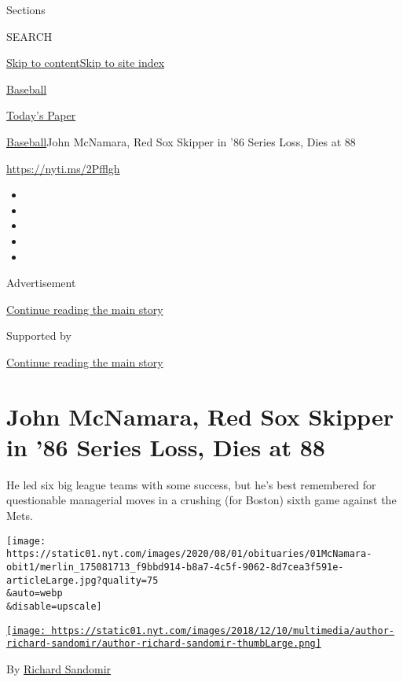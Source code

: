 Sections

SEARCH

\protect\hyperlink{site-content}{Skip to
content}\protect\hyperlink{site-index}{Skip to site index}

\href{https://www.nytimes.com/section/sports/baseball}{Baseball}

\href{https://myaccount.nytimes.com/auth/login?response_type=cookie\&client_id=vi}{}

\href{https://www.nytimes.com/section/todayspaper}{Today's Paper}

\href{/section/sports/baseball}{Baseball}\textbar{}John McNamara, Red
Sox Skipper in '86 Series Loss, Dies at 88

\url{https://nyti.ms/2Pfflgh}

\begin{itemize}
\item
\item
\item
\item
\item
\end{itemize}

Advertisement

\protect\hyperlink{after-top}{Continue reading the main story}

Supported by

\protect\hyperlink{after-sponsor}{Continue reading the main story}

\hypertarget{john-mcnamara-red-sox-skipper-in-86-series-loss-dies-at-88}{%
\section{John McNamara, Red Sox Skipper in '86 Series Loss, Dies at
88}\label{john-mcnamara-red-sox-skipper-in-86-series-loss-dies-at-88}}

He led six big league teams with some success, but he's best remembered
for questionable managerial moves in a crushing (for Boston) sixth game
against the Mets.

\texttt{[image: https://static01.nyt.com/images/2020/08/01/obituaries/01McNamara-obit1/merlin\_175081713\_f9bbd914-b8a7-4c5f-9062-8d7cea3f591e-articleLarge.jpg?quality=75\\\&auto=webp\\\&disable=upscale]}

\href{https://www.nytimes.com/by/richard-sandomir}{\texttt{[image: https://static01.nyt.com/images/2018/12/10/multimedia/author-richard-sandomir/author-richard-sandomir-thumbLarge.png]}}

By \href{https://www.nytimes.com/by/richard-sandomir}{Richard Sandomir}

